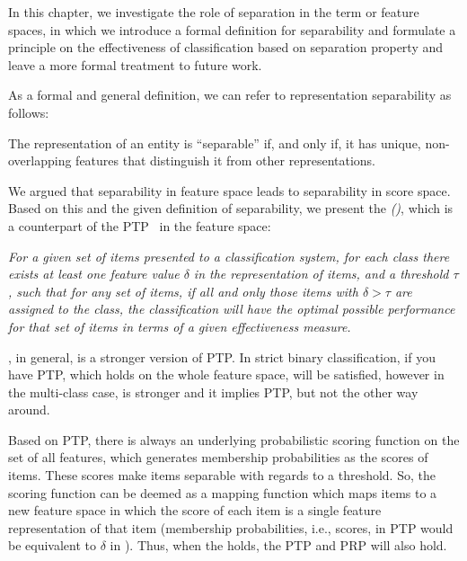 In this chapter, we investigate the role of separation in the term or feature spaces, in which we introduce a formal definition for separability and formulate a principle on the effectiveness of classification based on separation property and leave a more formal treatment to future work.
 
As a formal and general definition, we can refer to representation separability as follows:

\begin{mydef}
\label{def:sep}
The representation of an entity is ``{separable}'' if, and only if, it has %
unique, non-overlapping features that distinguish it from other representations.
\end{mydef}

We argued that separability in feature space leads to separability in score space. Based on this and the given definition of separability, we present the \emph{\ssp (\acssp)}, which is a counterpart of the PTP~\citep{Lewis:1995} in the feature space:

\begin{displayquote}
\emph{For a given set of items presented to a classification system, for each class there exists at least one feature value $\delta$ in the representation of items, and a threshold $\tau$, such that for any set of items, if all and only those items with $\delta > \tau$ are assigned to the class, the classification will have the optimal possible performance for that set of items in terms of a given effectiveness measure.}
\end{displayquote}

\acssp, in general, is a stronger version of PTP. 
In strict binary classification, if you have PTP, which holds on the whole feature space, \acssp will be satisfied, however in the multi-class case, \acssp is stronger and it implies PTP, but not the other way around.

Based on PTP, there is always an underlying probabilistic scoring function on the set of all features, which generates membership probabilities as the scores of items. These scores make items separable with regards to a threshold. 
So, the scoring function can be deemed as a mapping function which maps items to a new feature space in which the score of each item is a single feature representation of that item (membership probabilities, i.e., scores, in PTP would be equivalent to $\delta$ in \acssp). Thus, when the \acssp holds, the PTP and PRP will also hold.  

